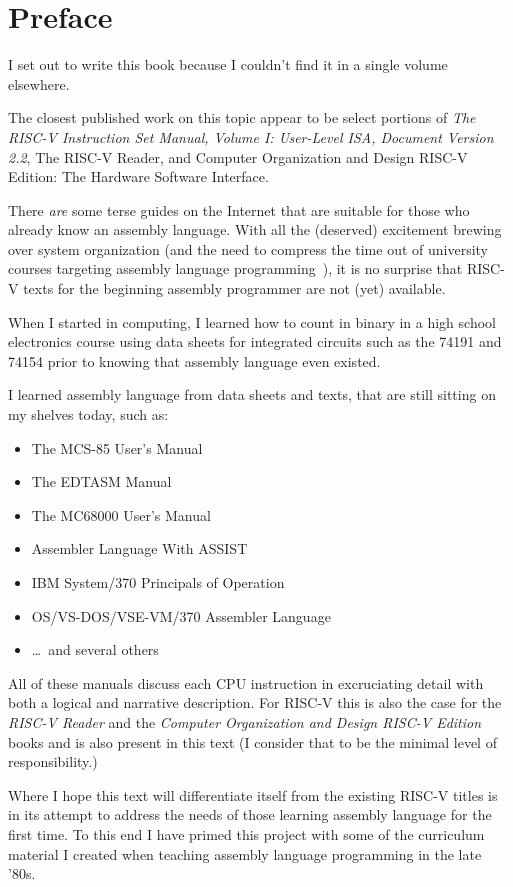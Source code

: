 \chapter{Preface}
\label{chapter:Preface}

I set out to write this book because I couldn't find it in a single volume elsewhere.

The closest published work on this topic appear to be select portions of 
{\em The RISC-V Instruction Set Manual, Volume I: User-Level ISA, Document Version 2.2}\cite{rvismv1v22:2017}, 
{The RISC-V Reader}\cite{riscvreader:2017}, and 
{Computer Organization and Design RISC-V Edition: The Hardware Software Interface}\cite{codriscv:2017}.

There {\em are} some terse guides on the Internet that are suitable 
for those who already know an assembly language.  With all the (deserved) 
excitement brewing over system organization (and the need to compress the 
time out of university courses targeting assembly language 
programming~\cite{Decker:1985:MAT:989369.989375}),
it is no surprise that RISC-V texts for the beginning assembly programmer 
are not (yet) available.

When I started in computing, I learned how to count in binary 
in a high school electronics course using data sheets for integrated 
circuits such as the 74191\cite{ttl74191:1979} and 74154\cite{ttl74154:1979}
prior to knowing that assembly language even existed.

I learned assembly language from data sheets and texts, that are still sitting on 
my shelves today, such as:
\begin{itemize}
\item The MCS-85 User's Manual\cite{mcs85:1978}
\item The EDTASM Manual\cite{edtasm:1978}
\item The MC68000 User's Manual\cite{mc68000:1980}
\item Assembler Language With ASSIST\cite{assist:1983}
\item IBM System/370 Principals of Operation\cite{poo:1980}
\item OS/VS-DOS/VSE-VM/370 Assembler Language\cite{assembler370:1979}
\item \ldots\ and several others
\end{itemize}

All of these manuals discuss each CPU instruction in excruciating detail 
with both a logical and narrative description.  For RISC-V this is 
also the case for the {\em RISC-V Reader}\cite{riscvreader:2017} and the 
{\em Computer Organization and Design RISC-V Edition}\cite{codriscv:2017} books
and is also present in this text (I consider that to be the minimal 
level of responsibility.)

Where I hope this text will differentiate itself from the existing RISC-V 
titles is in its attempt to address the needs of those learning assembly 
language for the first time.  To this end I have primed this project with 
some of the curriculum material I created when teaching assembly language 
programming in the late '80s.
